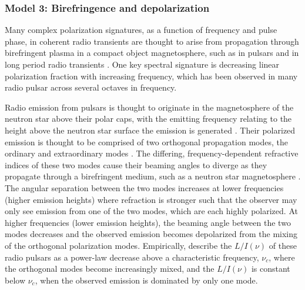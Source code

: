 \documentclass[twocolumn, linenumbers]{aastex701}
\begin{document}
\subsubsection{Model 3: Birefringence and depolarization} \label{subsec:model_3}
Many complex polarization signatures, as a function of frequency and pulse phase, in coherent radio transients are thought to arise from propagation through birefringent plasma in a compact object magnetosphere, such as in pulsars \citep[e.g.,][]{1981A&A...100..107M, 1998MNRAS.301..235G, 2008MNRAS.388..261J, 2015A&A...576A..62N} and in long period radio transients \citep[e.g.,][]{2024MNRAS.535..909D, 2026arXiv260307857P}. One key spectral signature is decreasing linear polarization fraction with increasing frequency, which has been observed in many radio pulsar across several octaves in frequency. 

Radio emission from pulsars is thought to originate in the magnetosphere of the neutron star above their polar caps, with the emitting frequency relating to the height above the neutron star surface the emission is generated \citep[sometimes referred to as ``radius-to-frequency mapping'';][]{1975ApJ...196...51R}. Their polarized emission is thought to be comprised of two orthogonal propagation modes, the ordinary and extraordinary modes \citep{1975ApJ...196...83M}. The differing, frequency-dependent refractive indices of these two modes cause their beaming angles to diverge as they propagate through a birefringent medium, such as a neutron star magnetosphere \citep{1986ApJ...302..138B}. The angular separation between the two modes increases at lower frequencies (higher emission heights) where refraction is stronger such that the observer may only see emission from one of the two modes, which are each highly polarized. At higher frequencies (lower emission heights), the beaming angle between the two modes decreases and the observed emission becomes depolarized from the mixing of the orthogonal polarization modes. Empirically, \cite{1973ApJ...179L...7M} describe the $L/I (\nu)$ of these radio pulsars as a power-law decrease above a characteristic frequency, $\nu_c$, where the orthogonal modes become increasingly mixed, and the $L/I (\nu)$ is constant below $\nu_c$, when the observed emission is dominated by only one mode. 
\end{document}
